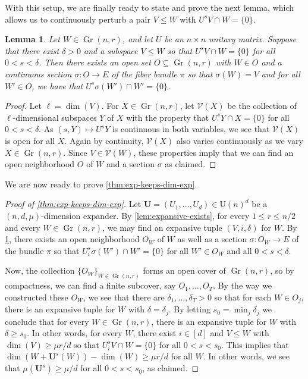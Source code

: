 \documentclass[11pt]{article}
\newtheorem{lemma}[theorem]{Lemma}
\theoremstyle{plain}
\numberwithin{equation}{section}
\theoremstyle{definition}
\DeclareMathOperator\Gr{Gr}
\newcommand{\tuple}[1]{\mathbf{#1}}
\newcommand{\V}{\mathcal{V}}
\newcommand{\vU}{\tuple{U}}
\begin{document}
With this setup, we are finally ready to state and prove the next lemma, which allows us to 
%
continuously perturb
%
a pair $V \leq W$ with $U^s V \cap W = \{0\}$.


\begin{lemma}\label{lem:section-exists}
    Let $W \in \Gr(n,r)$, and let $U$ be an $n\times n$ unitary matrix. Suppose that there exist $\delta>0$ and a subspace $V \leq W$ so that $U^s V \cap W = \{0\}$ for all $0<s<\delta$. Then there exists an open set $O \subseteq \Gr(n,r)$ with $W \in O$ and a continuous section $\sigma:O \to E$ of the fiber bundle $\pi$ so that $\sigma(W)=V$ and for all $W' \in O$, we have that $U^s \sigma(W') \cap W' = \{0\}$. 
\end{lemma}
\begin{proof}
    Let $\ell = \dim (V)$. For $X\in \Gr(n,r)$, let $\V(X)$ be the collection of $\ell$-dimensional subspaces $Y$ of $X$ with the property that $U^s Y \cap X = \{0\}$ for all $0<s<\delta$. As $(s,Y) \mapsto U^s Y$ is continuous in both variables, we see that $\V(X)$ is open for all $X$. Again by continuity, $\V(X)$ also varies continuously as we vary $X \in \Gr(n,r)$. Since $V \in \V(W)$, these properties imply that we can find an open neighborhood $O$ of $W$ and a section $\sigma$ as claimed. 
\end{proof}

We are now ready to prove \cref{thm:exp-keeps-dim-exp}.
\begin{proof}[Proof of \cref{thm:exp-keeps-dim-exp}]
    Let $\vU=(U_1,\dots,U_d)\in\mathrm{U}(n)^d$ be a $(n,d,\mu)$-dimension expander. By \cref{lem:expansive-exists}, for every $1 \leq r \leq n/2$ and every $W \in \Gr(n,r)$, we may find an expansive tuple $(V,i,\delta)$ for $W$. By \cref{lem:section-exists}, there exists an open neighborhood $O_W$ of $W$ as well as a section $\sigma:O_W \to E$ of the bundle $\pi$ so that $U_i^s \sigma(W') \cap W'=\{0\}$ for all $W' \in O_W$ and all $0<s<\delta$.

    Now, the collection $\{O_W\}_{W \in \Gr(n,r)}$ forms an open cover of $\Gr(n,r)$, so by compactness, we can find a finite subcover, say $O_1,\dots,O_T$. By the way we constructed these $O_W$, we see that there are $\delta_1,\dots,\delta_T>0$ so that for each $W \in O_j$, there is an expansive tuple for $W$ with $\delta=\delta_j$. By letting $s_0 = \min_{j} \delta_j$ we conclude that for every $W \in \Gr(n,r)$, there is an expansive tuple for $W$ with $\delta \geq s_0$. In other words, for every $W$, there exist $i \in [d]$ and $V\leq W$ with $\dim (V) \geq \mu r/d$ so that $U_i^s V \cap W=\{0\}$ for all $0 <s <s_0$. This implies that $\dim(W+\vU^s(W))-\dim(W)\geq \mu r/d$ for all $W$. In other words, we see that $\mu(\vU^s)\geq \mu/d$ for all $0<s<s_0$, as claimed.
\end{proof}
\end{document}
